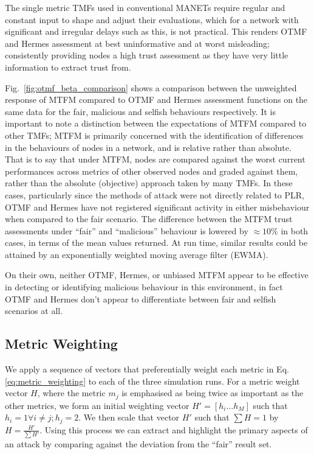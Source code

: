 The single metric TMFs used in conventional MANETs require regular and constant input to shape and adjust their evaluations, which for a network with significant and irregular delays such as this, is not practical.
This renders OTMF and Hermes assessment at best uninformative and at worst misleading; consistently providing nodes a high trust assessment as they have very little information to extract trust from. 

Fig.~\ref{fig:otmf_beta_comparison} shows a comparison between the unweighted response of MTFM compared to OTMF and Hermes assessment functions on the same data for the fair, malicious and selfish behaviours respectively.
It is important to note a distinction between the expectations of MTFM compared to other TMFs; MTFM is primarily concerned with the identification of differences in the behaviours of nodes in a network, and is relative rather than absolute.
That is to say that under MTFM, nodes are compared against the worst current performances across metrics of other observed nodes and graded against them, rather than the absolute (objective) approach taken by many TMFs.
In these cases, particularly since the methods of attack were not directly related to PLR, OTMF and Hermes have not registered significant activity in either misbehaviour when compared to the fair scenario.
The difference between the MTFM trust assessments under ``fair'' and ``malicious'' behaviour is lowered by $\approx 10\%$ in both cases, in terms of the mean values returned.
At run time, similar results could be attained by an exponentially weighted moving average filter (EWMA).

On their own, neither OTMF, Hermes, or unbiased MTFM appear to be effective in detecting or identifying malicious behaviour in this environment, in fact OTMF and Hermes don't appear to differentiate between fair and selfish scenarios at all.


\subsection{Metric Weighting}
%

We apply a sequence of vectors that preferentially weight each metric in Eq. \eqref{eq:metric_weighting} to each of the three simulation runs.
For a metric weight vector $H$, where the metric $m_j$ is emphasised as being twice as important as the other metrics, we form an initial weighting vector $H'=[h_i\dots h_M]$ such that $h_i = 1 \forall i \ne j; h_j=2$.
We then scale that vector $H'$ such that $\sum H = 1$ by $H= \frac{H'}{\sum H'}$.
Using this process we can extract and highlight the primary aspects of an attack by comparing against the deviation from the ``fair'' result set. 

